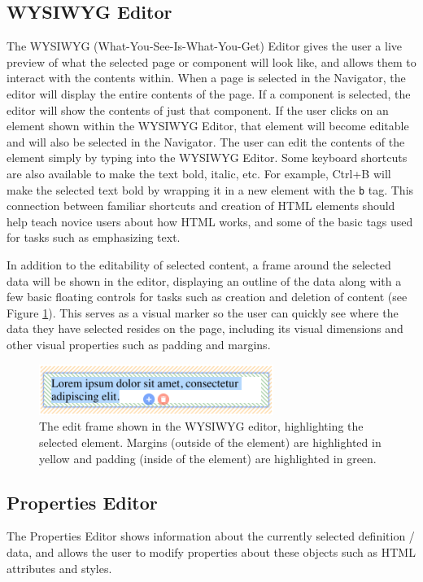\documentclass[conference, letterpaper]{IEEEtran}
\begin{document}
\subsection{WYSIWYG Editor}
The WYSIWYG (What-You-See-Is-What-You-Get) Editor gives the user a live preview of what the selected page or component will look like, and allows them to interact with the contents within. When a page is selected in the Navigator, the editor will display the entire contents of the page. If a component is selected, the editor will show the contents of just that component. If the user clicks on an element shown within the WYSIWYG Editor, that element will become editable and will also be selected in the Navigator. The user can edit the contents of the element simply by typing into the WYSIWYG Editor. Some keyboard shortcuts are also available to make the text bold, italic, etc. For example, Ctrl+B will make the selected text bold by wrapping it in a new element with the \texttt{b} tag. This connection between familiar shortcuts and creation of HTML elements should help teach novice users about how HTML works, and some of the basic tags used for tasks such as emphasizing text.

In addition to the editability of selected content, a frame around the selected data will be shown in the editor, displaying an outline of the data along with a few basic floating controls for tasks such as creation and deletion of content (see Figure \ref{fig:editframe}). This serves as a visual marker so the user can quickly see where the data they have selected resides on the page, including its visual dimensions and other visual properties such as padding and margins.

\begin{figure}[!t]
  \centering
  \includegraphics[width=3in]{../editframe.png}
  \caption{The edit frame shown in the WYSIWYG editor, highlighting the selected element. Margins (outside of the element) are highlighted in yellow and padding (inside of the element) are highlighted in green.}
  \label{fig:editframe}
\end{figure}

\subsection{Properties Editor}
The Properties Editor shows information about the currently selected definition / data, and allows the user to modify properties about these objects such as HTML attributes and styles.
\end{document}
